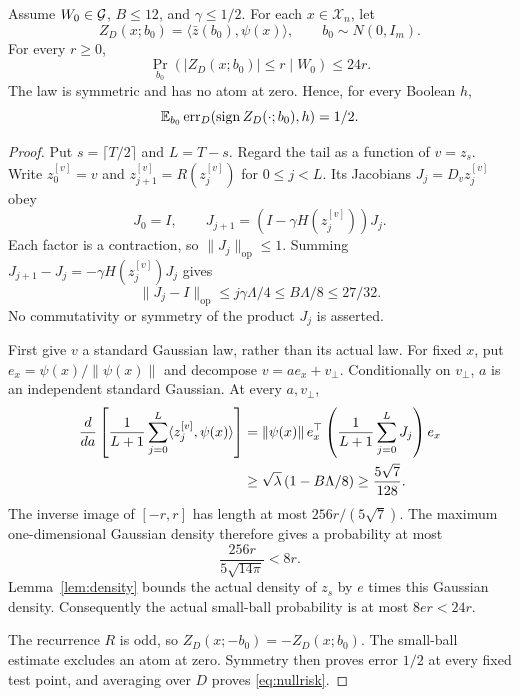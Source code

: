 \documentclass[11pt,letterpaper,pmlr,twoside]{jmlr}
\newcommand{\X}{\mathcal X}\newcommand{\Hc}{\mathcal H}
\newcommand{\err}{\operatorname{err}}\newcommand{\Risk}{\mathcal E}
\newcommand{\ip}[2]{\langle #1,#2\rangle}\newcommand{\norm}[1]{\lVert #1\rVert}
\newcommand{\op}{\mathrm{op}}\newcommand{\Unif}{\operatorname{Unif}}
\begin{document}
\begin{lemma}
\label{lem:smallball}
Assume $W_0\in\mathcal G$, $B\le12$, and $\gamma\le1/2$. For each $x\in\X_n$, let
\[
 Z_D(x;b_0)=\ip{\bar z(b_0)}{\psi(x)},\qquad b_0\sim N(0,I_m).
\]
For every $r\ge0$,
\begin{equation}
 \Pr_{b_0}(|Z_D(x;b_0)|\le r\mid W_0)\le24r.
 \label{eq:smallball}
\end{equation}
The law is symmetric and has no atom at zero. Hence, for every Boolean $h$,
\begin{equation}
 \E_{b_0}\err_D(\sgn Z_D(\cdot;b_0),h)=1/2.
 \label{eq:nullrisk}
\end{equation}
\end{lemma}
\begin{proof}
Put $s=\lceil T/2\rceil$ and $L=T-s$. Regard the tail as a function of $v=z_s$. Write $z^{[v]}_0=v$ and $z^{[v]}_{j+1}=R(z^{[v]}_j)$ for $0\le j<L$. Its Jacobians $J_j=D_vz^{[v]}_j$ obey
\[
 J_0=I,\qquad J_{j+1}=(I-\gamma H(z^{[v]}_j))J_j.
\]
Each factor is a contraction, so $\norm{J_j}_{\op}\le1$. Summing
$J_{j+1}-J_j=-\gamma H(z^{[v]}_j)J_j$ gives
\begin{equation}
 \norm{J_j-I}_{\op}\le j\gamma\Lambda/4
       \le B\Lambda/8\le27/32.
 \label{eq:Jac}
\end{equation}
No commutativity or symmetry of the product $J_j$ is asserted.

First give $v$ a standard Gaussian law, rather than its actual law. For fixed $x$, put $e_x=\psi(x)/\norm{\psi(x)}$ and decompose $v=ae_x+v_\perp$. Conditionally on $v_\perp$, $a$ is an independent standard Gaussian. At every $a,v_\perp$,
\begin{align}
 \frac{d}{da}\left[\frac1{L+1}\sum_{j=0}^L
             \ip{z^{[v]}_j}{\psi(x)}\right]
 &=\norm{\psi(x)}\,e_x^\top
     \left(\frac1{L+1}\sum_{j=0}^L J_j\right)e_x\notag\\
 &\ge\sqrt\lambda\,(1-B\Lambda/8)
 \ge\frac{5\sqrt7}{128}.
 \label{eq:derivative}
\end{align}
The inverse image of $[-r,r]$ has length at most $256r/(5\sqrt7)$. The maximum one-dimensional Gaussian density therefore gives a probability at most
\[
 \frac{256r}{5\sqrt{14\pi}}<8r.
\]
Lemma~\ref{lem:density} bounds the actual density of $z_s$ by $e$ times this Gaussian density. Consequently the actual small-ball probability is at most $8er<24r$.

The recurrence $R$ is odd, so $Z_D(x;-b_0)=-Z_D(x;b_0)$. The small-ball estimate excludes an atom at zero. Symmetry then proves error $1/2$ at every fixed test point, and averaging over $D$ proves \eqref{eq:nullrisk}.
\end{proof}
\end{document}
